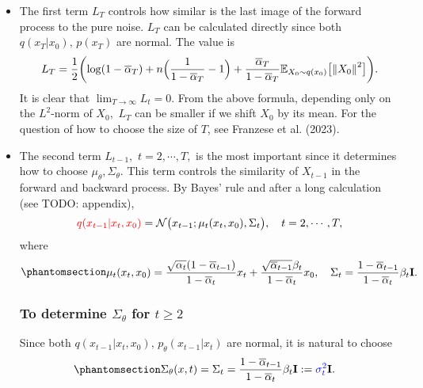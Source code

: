 \documentclass[
]{article}
\theoremstyle{remark}
\begin{document}
\begin{itemize}
\item
  The first term \(L_T\) controls how similar is the last image of the
  forward process to the pure noise. \(L_T\) can be calculated directly
  since both \(q(x_T \vert x_0),\, p(x_T)\) are normal. The value is \[
  \begin{aligned}
    L_T = \frac{1}{2} \biggl( \log (1-\overline{\alpha}_T) + n \Bigl( \frac{1}{1-\overline{\alpha}_T} - 1 \Bigr) + \frac{\overline{\alpha}_T}{1-\overline{\alpha}_T} \mathbb E_{X_0\sim q(x_0)}\bigl[ \left\lVert X_0 \right\rVert^2 \bigr] \biggr).
  \end{aligned}
  \] It is clear that \(\lim_{T\rightarrow\infty} L_t = 0.\) From the
  above formula, depending only on the \(L^2\)-norm of \(X_0,\) \(L_T\)
  can be smaller if we shift \(X_0\) by its mean. For the question of
  how to choose the size of \(T\), see Franzese et al. (2023).
\item
  The second term \(L_{t-1},\) \(t=2,\cdots,T,\) is the most important
  since it determines how to choose \(\mu_{\theta},\Sigma_{\theta}.\)
  This term controls the similarity of \(X_{t-1}\) in the forward and
  backward process. By Bayes' rule and after a long calculation (see
  TODO: appendix), \[
  \begin{aligned}
    {\color{red}{q(x_{t-1} \vert x_t,x_0)}} = \mathcal{N}\bigl( x_{t-1}; \mu_{t}(x_t,x_0),\Sigma_t \bigr),
    \quad t = 2,\cdots,T,
  \end{aligned}
  \] where \begin{equation}\phantomsection\label{eq-mu_t}{
  \begin{aligned}
    \mu_{t}(x_t,x_0)  
    = \frac{\sqrt{\alpha_t}(1-\overline{\alpha}_{t-1})}{1-\overline{\alpha}_t}x_t + \frac{\sqrt{\overline{\alpha}_{t-1}}\beta_t}{1-\overline{\alpha}_t}x_0 ,
    \quad
    \Sigma_t = \frac{1-\overline{\alpha}_{t-1}}{1-\overline{\alpha}_t}\beta_t \mathbf{I}.
  \end{aligned}
  }\end{equation}

  \subsubsection{\texorpdfstring{To determine \(\Sigma_{\theta}\) for
  \(t\geq 2\)}{To determine \textbackslash Sigma\_\{\textbackslash theta\} for t\textbackslash geq 2}}\label{to-determine-sigma_theta-for-tgeq-2}

  Since both
  \(q(x_{t-1}\vert x_t, x_0),\, p_{\theta}(x_{t-1}\vert x_t)\) are
  normal, it is natural to choose
  \begin{equation}\phantomsection\label{eq-Sig_the_indep_x}{
  \begin{aligned}
    \Sigma_{\theta}(x,t) =
    \Sigma_t &= \frac{1-\overline{\alpha}_{t-1}}{1-\overline{\alpha}_t}\beta_t \mathbf{I}
    := {\color{blue}{\sigma_t^2}} \mathbf{I}.
  \end{aligned}
  }\end{equation}


\end{itemize}
\end{document}
